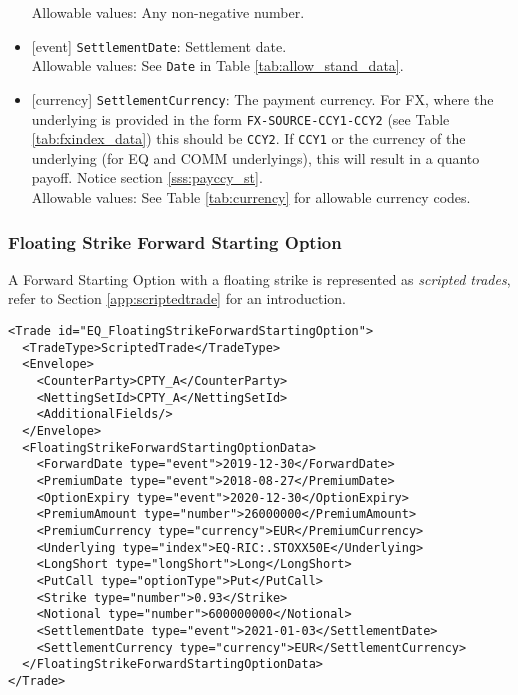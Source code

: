 \begin{itemize}
  Allowable values: Any non-negative number.
  \item{}[event] \lstinline!SettlementDate!: Settlement date. \\
  Allowable values: See \lstinline!Date! in Table \ref{tab:allow_stand_data}.
  \item{}[currency] \lstinline!SettlementCurrency!: The payment currency. For FX, where the underlying is provided
      in the form \lstinline!FX-SOURCE-CCY1-CCY2! (see Table \ref{tab:fxindex_data}) this should
      be \lstinline!CCY2!. If \lstinline!CCY1! or the currency of the underlying (for EQ and
      COMM underlyings), this will result in a quanto payoff. Notice section \ref{sss:payccy_st}. \\
        Allowable values: See Table \ref{tab:currency} for allowable currency codes.
\end{itemize}

\subsubsection{Floating Strike Forward Starting Option}
 
 
A Forward Starting Option with a floating strike is represented as {\em scripted trades}, refer to Section 
\ref{app:scriptedtrade} for an introduction.
 
\begin{verbatim} 
<Trade id="EQ_FloatingStrikeForwardStartingOption">
  <TradeType>ScriptedTrade</TradeType>
  <Envelope>
    <CounterParty>CPTY_A</CounterParty>
    <NettingSetId>CPTY_A</NettingSetId>
    <AdditionalFields/>
  </Envelope>
  <FloatingStrikeForwardStartingOptionData>
    <ForwardDate type="event">2019-12-30</ForwardDate>
    <PremiumDate type="event">2018-08-27</PremiumDate>
    <OptionExpiry type="event">2020-12-30</OptionExpiry>
    <PremiumAmount type="number">26000000</PremiumAmount>
    <PremiumCurrency type="currency">EUR</PremiumCurrency>
    <Underlying type="index">EQ-RIC:.STOXX50E</Underlying>
    <LongShort type="longShort">Long</LongShort>
    <PutCall type="optionType">Put</PutCall>
    <Strike type="number">0.93</Strike>
    <Notional type="number">600000000</Notional>
    <SettlementDate type="event">2021-01-03</SettlementDate>
    <SettlementCurrency type="currency">EUR</SettlementCurrency>
  </FloatingStrikeForwardStartingOptionData>
</Trade>
\end{verbatim} 
 

